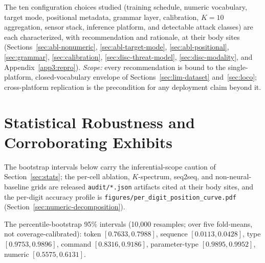 \documentclass[sensors,article,submit,moreauthors,pdftex]{Definitions/mdpi}
\begin{document}
The ten configuration choices studied (training schedule, numeric vocabulary, target mode, positional metadata, grammar layer, calibration, $K\!=\!10$ aggregation, sensor stack, inference platform, and detectable attack classes) are each characterized, with recommendation and rationale, at their body sites (Sections~\ref{sec:abl-nonumeric}, \ref{sec:abl-target-mode}, \ref{sec:abl-positional}, \ref{sec:grammar}, \ref{sec:calibration}, \ref{sec:disc-threat-model}, \ref{sec:disc-modality}, and Appendix~\ref{app3:repro}). \emph{Scope:} every recommendation is bound to the single-platform, closed-vocabulary envelope of Sections~\ref{sec:lim-dataset} and~\ref{sec:loco}; cross-platform replication is the precondition for any deployment claim beyond it.

\section{Statistical Robustness and Corroborating Exhibits}
\label{app3:stats}

The bootstrap intervals below carry the inferential-scope caution of Section~\ref{sec:stats}; the per-cell ablation, $K$-spectrum, seq2seq, and non-neural-baseline grids are released \texttt{audit/*.json} artifacts cited at their body sites, and the per-digit accuracy profile is \texttt{figures/per\_digit\_position\_curve.pdf} (Section~\ref{sec:numeric-decomposition}).

The percentile-bootstrap 95\% intervals (10{,}000 resamples; over five fold-means, not coverage-calibrated): token $[0.7633, 0.7988]$, sequence $[0.0113, 0.0428]$, type $[0.9753, 0.9896]$, command $[0.8316, 0.9186]$, parameter-type $[0.9895, 0.9952]$, numeric $[0.5575, 0.6131]$.




\end{document}
